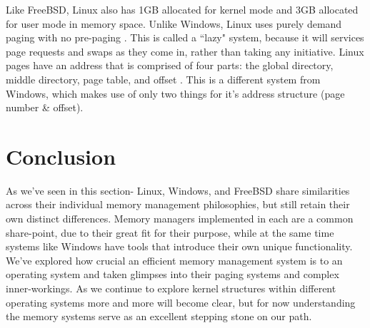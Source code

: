 \documentclass[10pt,draftclsnofoot,onecolumn]{IEEEtran}
\begin{document}
\par Like FreeBSD, Linux also has 1GB allocated for kernel mode and 3GB allocated for user mode in memory space.
Unlike Windows, Linux uses purely demand paging with no pre-paging \cite{linux:1}.
This is called a ``lazy" system, because it will services page requests and swaps as they come in, rather than taking any initiative.
Linux pages have an address that is comprised of four parts: the global directory, middle directory, page table, and offset \cite{linux:1}.
This is a different system from Windows, which makes use of only two things for it's address structure (page number \& offset).



\section{Conclusion}
\label{sec:Conclusion}
\par As we've seen in this section- Linux, Windows, and FreeBSD share similarities across their individual memory management philosophies, but still retain their own distinct differences.
Memory managers implemented in each are a common share-point, due to their great fit for their purpose, while at the same time systems like Windows have tools that introduce their own unique functionality.
We've explored how crucial an efficient memory management system is to an operating system and taken glimpses into their paging systems and complex inner-workings.
As we continue to explore kernel structures within different operating systems more and more will become clear, but for now understanding the memory systems serve as an excellent stepping stone on our path.

%
%
%



\end{document}
